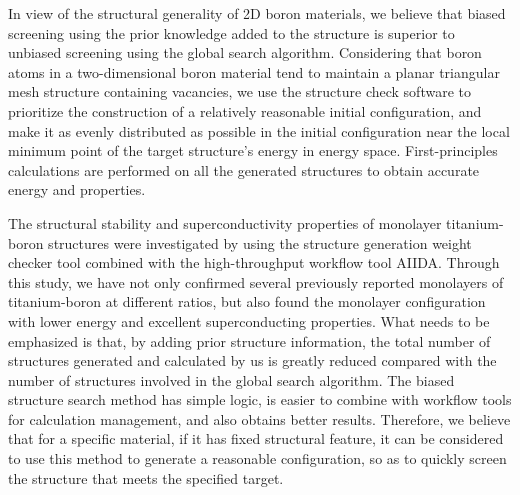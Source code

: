 \documentclass[phd,nobackinfo]{scutthesis}
\begin{document}
\begin{englishabstract}
In view of the structural generality of 2D boron materials, we believe that biased screening using the prior knowledge added to the structure is superior to unbiased screening using the global search algorithm. Considering that boron atoms in a two-dimensional boron material tend to maintain a planar triangular mesh structure containing vacancies, we use the structure check software to prioritize the construction of a relatively reasonable initial configuration, and make it as evenly distributed as possible in the initial configuration near the local minimum point of the target structure's energy in energy space. First-principles calculations are performed on all the generated structures to obtain accurate energy and properties.

The structural stability and superconductivity properties of monolayer titanium-boron structures were investigated by using the structure generation weight checker tool combined with the high-throughput workflow tool AIIDA.
Through this study, we have not only confirmed several previously reported monolayers of titanium-boron at different ratios, but also found the  monolayer configuration with lower energy and excellent superconducting properties. What needs to be emphasized is that, by adding prior structure information, the total number of structures generated and calculated by us is greatly reduced compared with the number of structures involved in the global search algorithm. The biased structure search method has simple logic, is easier to combine with workflow tools for calculation management, and also obtains better results. Therefore, we believe that for a specific material, if it has fixed structural feature, it can be considered to use this method to generate a reasonable configuration, so as to quickly screen the structure that meets the specified target.
\end{englishabstract}
\end{document}
